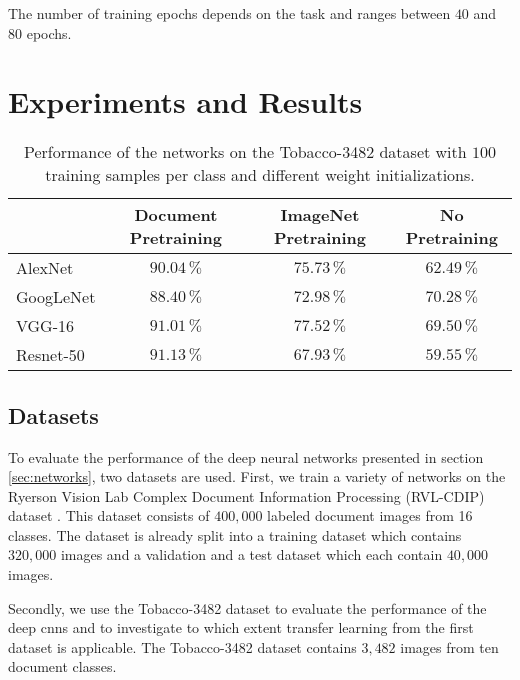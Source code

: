 \documentclass[conference]{IEEEtran}
\begin{document}
The number of training epochs depends on the task and ranges between $40$ and $80$ epochs.


























 \section{Experiments and Results}

\begin{table*}
\renewcommand{\arraystretch}{1.3}
\centering
\caption{Performance of the networks on the Tobacco-3482 dataset with $100$ training samples per class and different weight initializations.}
\begin{tabular}{l|c|c|c}
 & Document Pretraining & ImageNet Pretraining & No Pretraining \\\hline
AlexNet & $90.04\,\%$ & $75.73\,\%$ & $62.49\,\%$ \\\hline
GoogLeNet & $88.40\,\%$ & $72.98\,\%$ & $70.28\,\%$ \\\hline
VGG-16 & $91.01\,\%$ & $77.52\,\%$ & $69.50\,\%$ \\\hline
Resnet-50 & $91.13\,\%$ & $67.93\,\%$ & $59.55\,\%$
\end{tabular}
\label{tab:accuracy_small}
\end{table*}



\subsection{Datasets}
To evaluate the performance of the deep neural networks presented in section \ref{sec:networks}, two datasets are used. First, we train a variety of networks on the Ryerson Vision Lab Complex Document Information Processing (RVL-CDIP) dataset \cite{harley2015evaluation}. This dataset consists of $400,000$ labeled document images from 16 classes. The dataset is already split into a training dataset which contains $320,000$ images and a validation and a test dataset which each contain $40,000$ images.

Secondly, we use the Tobacco-3482 dataset \cite{doclass_Kumar14} to evaluate the performance of the deep \ac{cnn}s and to investigate to which extent transfer learning from the first dataset is applicable. The Tobacco-3482 dataset contains $3,482$ images from ten document classes. 
\end{document}
